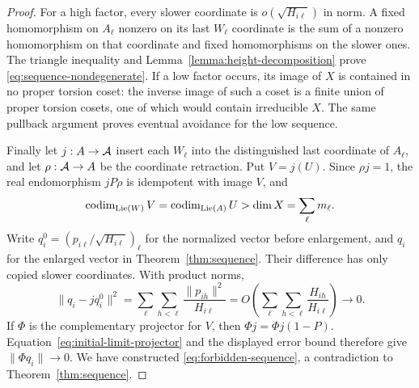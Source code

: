 \begin{proof}
For a high factor, every slower coordinate is
$o(\sqrt{H_{i\ell}})$ in norm. A fixed homomorphism on $A_\ell$
nonzero on its last $W_\ell$ coordinate is the sum of a nonzero
homomorphism on that coordinate and fixed homomorphisms on the slower
ones. The triangle inequality and
Lemma~\ref{lemma:height-decomposition} prove
\eqref{eq:sequence-nondegenerate}. If a low factor occurs, its image
of $X$ is contained in no proper torsion coset: the inverse image of
such a coset is a finite union of proper torsion cosets, one of which
would contain irreducible $X$. The same pullback argument proves
eventual avoidance for the low sequence.

Finally let $j:A\to\mathcal A$ insert each $W_\ell$ into the distinguished
last coordinate of $A_\ell$, and let $\rho:\mathcal A\to A$ be the
coordinate retraction. Put $V=j(U)$. Since $\rho j=1$, the real
endomorphism $jP\rho$ is idempotent with image $V$, and
\[
 \operatorname{codim}_{\operatorname{Lie}(W)}V=\operatorname{codim}_{\operatorname{Lie}(A)}U>\dim X
 =\sum_\ell m_\ell.
\]
Write $q_i^0=(p_{i\ell}/\sqrt{H_{i\ell}})_\ell$ for the normalized
vector before enlargement, and $q_i$ for the enlarged vector in
Theorem~\ref{thm:sequence}. Their difference has only copied slower
coordinates. With product norms,
\[
 \|q_i-jq_i^0\|^2
 =\sum_\ell\sum_{h<\ell}\frac{\|p_{ih}\|^2}{H_{i\ell}}
 =O\!\left(\sum_\ell\sum_{h<\ell}
                  \frac{H_{ih}}{H_{i\ell}}\right)\longrightarrow0.
\]
If $\Phi$ is the complementary projector for $V$, then
$\Phi j=\Phi j(1-P)$. Equation~\eqref{eq:initial-limit-projector}
and the displayed error bound therefore give $\|\Phi q_i\|\to0$.
We have constructed \eqref{eq:forbidden-sequence}, a contradiction to
Theorem~\ref{thm:sequence}.
\end{proof}
